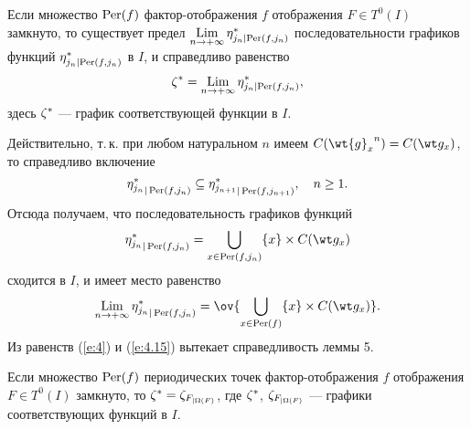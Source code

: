 \begin{lem}
Если множество $\operatorname{Per}(f)$ фактор-отображения $f$ отображения
$F\in T^0(I)$ замкнуто, то существует предел
$\Lim\limits_{n\to +\infty} \eta^*_{j_n|
{\Per(f, j_n)}}$ последовательности графиков функций $\eta^*_{j_n|
{\operatorname{Per}(f, j_n)}}$ в $I$, и справедливо равенство
$$
\ze^*=\Lim_{n\to +\infty}\eta^*_{j_n| {\Per(f, j_n)}},
$$
здесь $\zeta^*$ --- график соответствующей функции в $I$.
\end{lem}

Действительно, т.\,к. при любом натуральном $n$ имеем
$C({\wt {g}_x}^n)=C(\wt g_x)$, то справедливо включение
$$
{\eta^*_{j_n}}_{| \operatorname{Per}(f, j_n)}\subseteq
{\eta^*_{j_{n+1}}}_{| \operatorname{Per}(f, j_{n+1})},\quad n\geq 1.
$$
Отсюда получаем, что последовательность графиков функций
$$
{\eta^*_{j_n}}_{| \Per(f, j_n)}=\bigcup\limits_{x\in
\Per(f, j_n)}\{x\}\times C(\wt g_x)
$$
сходится в $I$, и имеет место равенство
\begin{equation}\label{e:4.15}
\Lim_{n\to +\infty}{\eta^*_{j_n}}_{| \Per(f, j_n)}=
\ov {\bigcup\limits_{x\in \Per(f)}\{x\}\times C(\wt g_x)}.
\end{equation}
Из равенств (\ref{e:4}) и (\ref{e:4.15})
вытекает справедливость леммы 5.


\begin{lem}
Если множество $\operatorname{Per}(f)$ периодических
точек фактор-отображения $f$
отображения $F\in T^0(I)$ замкнуто, то
$\zeta^*=\zeta_{F_{|\Omega(F)}}$,
где $\zeta^*$, $\zeta_{F_{|\Omega(F)}}$ ---
графики соответствующих функций в $I$.
\end{lem}


